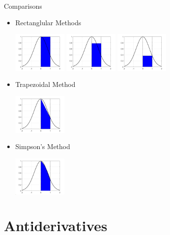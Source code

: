 {}\documentclass[letterpaper,
compress,
xcolor=x11names,
]{beamer}
\begin{document}
\begin{frame}{Comparisons}
	\footnotesize
	\begin{itemize}
		\item Rectanglular Methods
		\begin{center}
			\includegraphics[height = 2cm]{left_approx.png}
			\includegraphics[height = 2cm]{center_approx.png}
			\includegraphics[height = 2cm]{right_approx.png}
		\end{center}
		\item Trapezoidal Method
		\begin{center}
			\includegraphics[height = 2cm]{trapz_approx.png}
		\end{center}
		\item Simpson's Method
		\begin{center}
			\includegraphics[height = 2cm]{simps_approx.png}
		\end{center}
	\end{itemize}
\end{frame}

\section{Antiderivatives}
\end{document}
